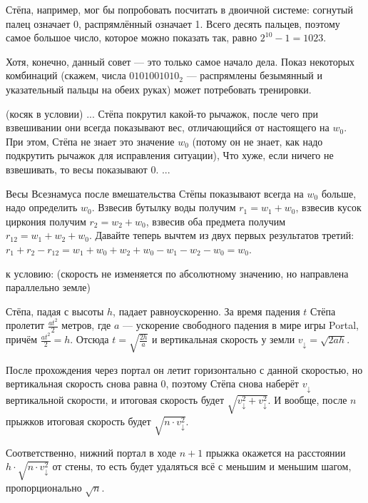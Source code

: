 \begin{itemize}
\itA Стёпа, например, мог бы попробовать посчитать в двоичной системе:
согнутый палец означает 0, распрямлённый означает 1. Всего десять пальцев,
поэтому самое большое число, которое можно показать так, равно $2^{10}-1 = 1023$.

Хотя, конечно, данный совет --- это только самое начало дела. Показ некоторых
комбинаций (скажем, числа $0101001010_2$ --- распрямлены безымянный и указательный
пальцы на обеих руках) может потребовать тренировки.


\itB (косяк в условии) ... Стёпа покрутил какой-то рычажок, после чего при взвешивании
они всегда показывают вес, отличающийся от настоящего на $w_0$. При этом, Стёпа не знает
это значение $w_0$ (потому он не знает, как надо подкрутить рычажок для исправления ситуации), 
Что хуже, если ничего не взвешивать, то весы показывают 0.  ...

Весы Всезнамуса после вмешательства Стёпы показывают всегда на $w_0$ больше, надо определить $w_0$.
Взвесив бутылку воды получим $r_1 = w_1 + w_0$, взвесив кусок циркония получим $r_2 = w_2 + w_0$,
взвесив оба предмета получим $r_{12} = w_1 + w_2 + w_0$. Давайте теперь вычтем из двух 
первых результатов третий:
$r_1 + r_2 - r_{12} = w_1 + w_0 + w_2 + w_0 - w_1 - w_2 - w_0 = w_0$.

\itC 
к условию: (скорость не изменяется по абсолютному значению, но направлена параллельно земле)

Стёпа, падая с высоты $h$, падает равноускоренно. За время падения $t$ Стёпа пролетит 
$\frac{at^2}{2}$ метров, где $a$ --- ускорение свободного падения в мире игры Portal, 
причём $\frac{at^2}{2} = h$. Отсюда $t = \sqrt{\frac{2h}{a}}$ и вертикальная скорость
у земли $v_\downarrow = \sqrt{2ah}$.

После прохождения через портал он летит горизонтально с данной скоростью, но вертикальная
скорость снова равна 0, поэтому Стёпа снова наберёт $v_\downarrow$ вертикальной скорости, и
итоговая скорость будет $\sqrt{v_\downarrow^2 + v_\downarrow^2}$.
И вообще, после $n$ прыжков итоговая скорость будет $\sqrt{n \cdot v_\downarrow^2}$.

Соответственно, нижний портал в ходе $n+1$ прыжка окажется на расстоянии 
$h \cdot \sqrt{n \cdot v_\downarrow^2}$ от стены,
то есть будет удаляться всё с меньшим и меньшим шагом, пропорционально $\sqrt{n}$.

\end{itemize}
